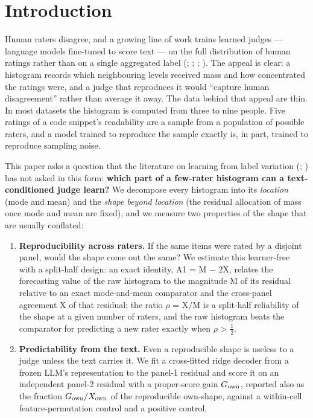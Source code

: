 \documentclass[10pt]{article}
\providecommand{\tightlist}{\setlength{\itemsep}{0pt}\setlength{\parskip}{0pt}}
\begin{document}
\section{Introduction}

Human raters disagree, and a growing line of work trains learned judges --- language models fine-tuned to score text --- on the full distribution of human ratings rather than on a single aggregated label (\citealp{chen2025beyond}; \citealp{singh2025distributions}; \citealp{kohli2026metric}; \citealp{benitosantos2025beyond}). The appeal is clear: a histogram records which neighbouring levels received mass and how concentrated the ratings were, and a judge that reproduces it would ``capture human disagreement'' rather than average it away. The data behind that appeal are thin. In most datasets the histogram is computed from three to nine people. Five ratings of a code snippet's readability are a sample from a population of possible raters, and a model trained to reproduce the sample exactly is, in part, trained to reproduce sampling noise.

This paper asks a question that the literature on learning from label variation (\citealp{uma2021learning}; \citealp{plank2022problem}) has not asked in this form: \textbf{which part of a few-rater histogram can a text-conditioned judge learn?} We decompose every histogram into its \emph{location} (mode and mean) and the \emph{shape beyond location} (the residual allocation of mass once mode and mean are fixed), and we measure two properties of the shape that are usually conflated:

\begin{enumerate}
\def\labelenumi{\arabic{enumi}.}
\tightlist
\item
  \textbf{Reproducibility across raters.} If the same items were rated by a disjoint panel, would the shape come out the same? We estimate this learner-free with a split-half design: an exact identity, A1 = M $-$ 2X, relates the forecasting value of the raw histogram to the magnitude M of its residual relative to an exact mode-and-mean comparator and the cross-panel agreement X of that residual; the ratio $\rho$ = X/M is a split-half reliability of the shape at a given number of raters, and the raw histogram beats the comparator for predicting a new rater exactly when $\rho$ \textgreater{} $\tfrac12$.
\item
  \textbf{Predictability from the text.} Even a reproducible shape is useless to a judge unless the text carries it. We fit a cross-fitted ridge decoder from a frozen LLM's representation to the panel-1 residual and score it on an independent panel-2 residual with a proper-score gain \(G_{\rm own}\), reported also as the fraction \(G_{\rm own}/X_{\rm own}\) of the reproducible own-shape, against a within-cell feature-permutation control and a positive control.
\end{enumerate}
\end{document}
